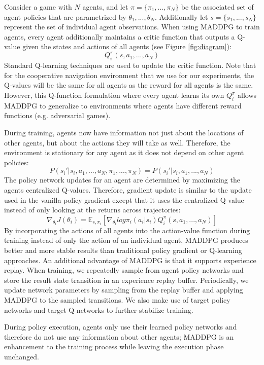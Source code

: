\documentclass{article}
\begin{document}
Consider a game with $N$ agents, and let $\pi = \{\pi_1, ..., \pi_N\}$ be the associated set of agent policies that are parametrized by $\theta_1, ..., \theta_N$. Additionally let $s = \{s_1, ..., s_N\}$ represent the set of individual agent observations. When using MADDPG to train agents, every agent additionally maintains a critic function that outputs a Q-value given the states and actions of all agents (see Figure \ref{fig:diagram}):
$$Q^\pi_i(s, a_1, ..., a_N)$$
Standard Q-learning techniques are used to update the critic function. Note that for the cooperative navigation environment that we use for our experiments, the Q-values will be the same for all agents as the reward for all agents is the same. However, this Q-function formulation where every agent learns its own $Q^\pi_i$ allows MADDPG to generalize to environments where agents have different reward functions (e.g. adversarial games).

During training, agents now have information not just about the locations of other agents, but about the actions they will take as well. Therefore, the environment is stationary for any agent as it does not depend on other agent policies:
$$P(s_i'|s_i, a_1, ..., a_N, \pi_1, ..., \pi_N) = P(s_i'|s_i, a_1, ..., a_N)$$
The policy network updates for an agent are determined by maximizing the agents centralized Q-values. Therefore, gradient update is similar to the update used in the vanilla policy gradient except that it uses the centralized Q-value instead of only looking at the returns across trajectories:
$$\nabla_{\theta_i}J(\theta_i) = \mathbb{E}_{s, \pi_i}[\nabla_{\theta_i}log \pi_i(a_i|s_i)Q^{\pi}_i(s, a_1, ..., a_N)]$$
By incorporating the actions of all agents into the action-value function during training instead of only the action of an individual agent, MADDPG produces better and more stable results than traditional policy gradient or Q-learning approaches. An additional advantage of MADDPG is that it supports experience replay. When training, we repeatedly sample from agent policy networks and store the result state transition in an experience replay buffer. Periodically, we update network parameters by sampling from the replay buffer and applying MADDPG to the sampled transitions. We also make use of target policy networks and target Q-networks to further stabilize training.

During policy execution, agents only use their learned policy networks and therefore do not use any information about other agents; MADDPG is an enhancement to the training process while leaving the execution phase unchanged.
\end{document}
